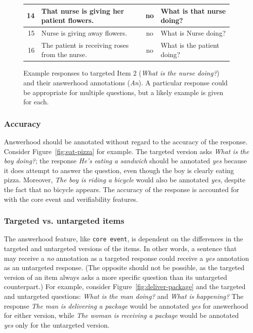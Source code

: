 \documentclass[12pt,notitlepage]{article}
\newcommand{\feat}[1]{\texttt{#1}}
\begin{document}
\begin{figure}[h!]
\begin{center}
\begin{tabular}{|r|l|c|l|}
\hline
14 & That nurse is giving her patient flowers. & no & What is that nurse doing? \\
\hline
15 & Nurse is giving away flowers. & no & What is Nurse doing? \\
\hline
16 & The patient is receiving roses from the nurse. & no & What is the patient doing?\\
\hline
\end{tabular}
\end{center}
\caption{Example responses to targeted Item 2 (\textit{What is the nurse doing?}) and their answerhood annotations (\textit{An}). A particular response could be appropriate for multiple questions, but a likely example is given for each.}
\label{fig:answerhood-examples}
\end{figure}
\clearpage


\subsubsection{Accuracy} Answerhood should be annotated without regard to the accuracy of the response. Consider Figure~\ref{fig:eat-pizza} for example. The targeted version asks \textit{What is the boy doing?}; the response \textit{He's eating a sandwich} should be annotated \textit{yes} because it does attempt to answer the question, even though the boy is clearly eating pizza. Moreover, \textit{The boy is riding a bicycle} would also be annotated \textit{yes}, despite the fact that no bicycle appears. The accuracy of the response is accounted for with the core event and verifiability features.

\subsubsection{Targeted vs. untargeted items} The answerhood feature, like \feat{core event}, is dependent on the differences in the targeted and untargeted versions of the items. In other words, a sentence that may receive a \textit{no} annotation as a targeted response could receive a \textit{yes} annotation as an untargeted response. (The opposite should not be possible, as the targeted version of an item always asks a more specific question than its untargeted counterpart.) For example, consider Figure~\ref{fig:deliver-package} and the targeted and untargeted questions: \textit{What is the man doing?} and \textit{What is happening?} The response \textit{The man is delivering a package} would be annotated \textit{yes} for answerhood for either version, while \textit{The woman is receiving a package} would be annotated \textit{yes} only for the untargeted version.
\end{document}
